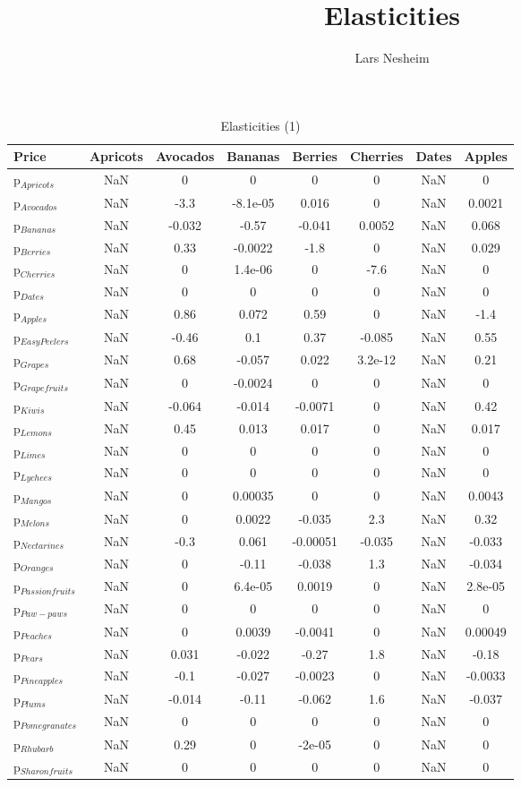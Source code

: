 \documentclass[11pt]{article}
\title{Elasticities}
\author{Lars Nesheim}
\date{}
\begin{document}
\maketitle
\begin{table}[h]
\caption{Elasticities (1)}
\label{Table: elasticities 1}
\begin{center}
\begin{tabular}{lccccccc} \hline \hline
Price &Apricots &Avocados &Bananas &Berries &Cherries &Dates &Apples \\ \hline
p$_{Apricots}$ &NaN &0 &0 &0 &0 &NaN &0 \\
p$_{Avocados}$ &NaN &-3.3 &-8.1e-05 &0.016 &0 &NaN &0.0021 \\
p$_{Bananas}$ &NaN &-0.032 &-0.57 &-0.041 &0.0052 &NaN &0.068 \\
p$_{Berries}$ &NaN &0.33 &-0.0022 &-1.8 &0 &NaN &0.029 \\
p$_{Cherries}$ &NaN &0 &1.4e-06 &0 &-7.6 &NaN &0 \\
p$_{Dates}$ &NaN &0 &0 &0 &0 &NaN &0 \\
p$_{Apples}$ &NaN &0.86 &0.072 &0.59 &0 &NaN &-1.4 \\
p$_{Easy Peelers}$ &NaN &-0.46 &0.1 &0.37 &-0.085 &NaN &0.55 \\
p$_{Grapes}$ &NaN &0.68 &-0.057 &0.022 &3.2e-12 &NaN &0.21 \\
p$_{Grapefruits}$ &NaN &0 &-0.0024 &0 &0 &NaN &0 \\
p$_{Kiwis}$ &NaN &-0.064 &-0.014 &-0.0071 &0 &NaN &0.42 \\
p$_{Lemons}$ &NaN &0.45 &0.013 &0.017 &0 &NaN &0.017 \\
p$_{Limes}$ &NaN &0 &0 &0 &0 &NaN &0 \\
p$_{Lychees}$ &NaN &0 &0 &0 &0 &NaN &0 \\
p$_{Mangos}$ &NaN &0 &0.00035 &0 &0 &NaN &0.0043 \\
p$_{Melons}$ &NaN &0 &0.0022 &-0.035 &2.3 &NaN &0.32 \\
p$_{Nectarines}$ &NaN &-0.3 &0.061 &-0.00051 &-0.035 &NaN &-0.033 \\
p$_{Oranges}$ &NaN &0 &-0.11 &-0.038 &1.3 &NaN &-0.034 \\
p$_{Passion fruits}$ &NaN &0 &6.4e-05 &0.0019 &0 &NaN &2.8e-05 \\
p$_{Paw-paws}$ &NaN &0 &0 &0 &0 &NaN &0 \\
p$_{Peaches}$ &NaN &0 &0.0039 &-0.0041 &0 &NaN &0.00049 \\
p$_{Pears}$ &NaN &0.031 &-0.022 &-0.27 &1.8 &NaN &-0.18 \\
p$_{Pineapples}$ &NaN &-0.1 &-0.027 &-0.0023 &0 &NaN &-0.0033 \\
p$_{Plums}$ &NaN &-0.014 &-0.11 &-0.062 &1.6 &NaN &-0.037 \\
p$_{Pomegranates}$ &NaN &0 &0 &0 &0 &NaN &0 \\
p$_{Rhubarb}$ &NaN &0.29 &0 &-2e-05 &0 &NaN &0 \\
p$_{Sharon fruits}$ &NaN &0 &0 &0 &0 &NaN &0 \\
\end{tabular}
\end{center}
\end{table}
\end{document}
